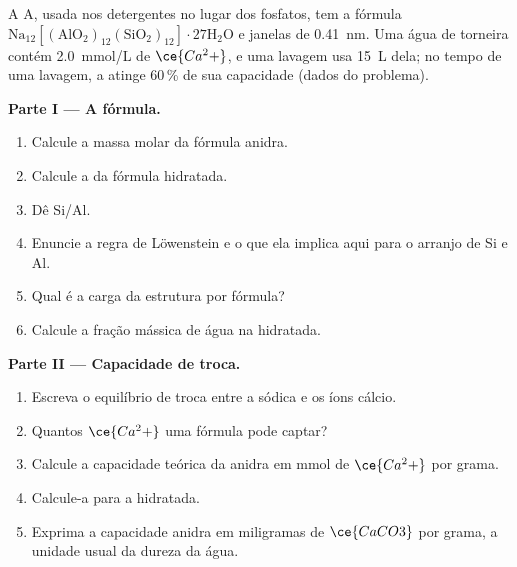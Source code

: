 \begin{problem}
\label{pb:b3:inorganic-materials:1}
A  A, usada nos detergentes no lugar dos fosfatos, tem a fórmula
$\mathrm{Na_{12}[(AlO_2)_{12}(SiO_2)_{12}]\cdot 27H_2O}$ e janelas de \qty{0.41}{nm}. Uma água de torneira contém
\qty{2.0}{mmol/L} de $\ce{Ca^2+}$, e uma lavagem usa \qty{15}{L} dela; no tempo de uma lavagem, a 
atinge 60\,\% de sua capacidade (dados do problema).

\medskip\noindent\textbf{Parte I --- A fórmula.}
\begin{enumerate}
  \item Calcule a massa molar da fórmula anidra.
  \item Calcule a da fórmula hidratada.
  \item Dê Si/Al.
  \item Enuncie a regra de Löwenstein e o que ela implica aqui para o arranjo de
        Si e Al.
  \item Qual é a carga da estrutura por fórmula?
  \item Calcule a fração mássica de água na  hidratada.
\end{enumerate}

\medskip\noindent\textbf{Parte II --- Capacidade de troca.}
\begin{enumerate}[resume]
  \item Escreva o equilíbrio de troca entre a  sódica e os íons
        cálcio.
  \item Quantos $\ce{Ca^2+}$ uma fórmula pode captar?
  \item Calcule a capacidade teórica da  anidra em mmol de $\ce{Ca^2+}$
        por grama.
  \item Calcule-a para a  hidratada.
  \item Exprima a capacidade anidra em miligramas de $\ce{CaCO3}$ por grama, a unidade usual
        da dureza da água.
\end{enumerate}


\end{problem}
